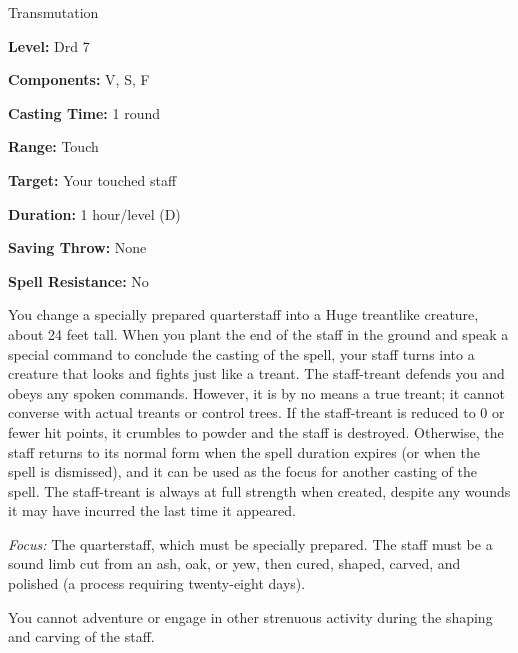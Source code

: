 
Transmutation

\textbf{Level:} Drd 7

\textbf{Components:} V, S, F

\textbf{Casting Time:} 1 round

\textbf{Range:} Touch

\textbf{Target:} Your touched staff

\textbf{Duration:} 1 hour/level (D)

\textbf{Saving Throw:} None

\textbf{Spell Resistance:} No

You change a specially prepared quarterstaff into a Huge treantlike creature, about 
24 feet tall. When you plant the end of the staff in the ground and speak a special 
command to conclude the casting of the spell, your staff turns into a creature 
that looks and fights just like a treant. The staff-treant defends you and obeys 
any spoken commands. However, it is by no means a true treant; it cannot converse 
with actual treants or control trees. If the staff-treant is reduced to 0 or fewer 
hit points, it crumbles to powder and the staff is destroyed. Otherwise, the staff 
returns to its normal form when the spell duration expires (or when the spell is 
dismissed), and it can be used as the focus for another casting of the spell. The 
staff-treant is always at full strength when created, despite any wounds it may 
have incurred the last time it appeared.

\textit{Focus:} The quarterstaff, which must be specially prepared. The staff must 
be a sound limb cut from an ash, oak, or yew, then cured, shaped, carved, and polished 
(a process requiring twenty-eight days).

You cannot adventure or engage in other strenuous activity during the shaping and 
carving of the staff.

